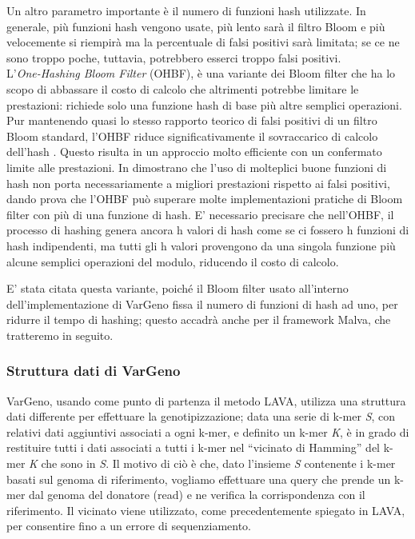 \documentclass[../main.tex]{subfiles}
\begin{document}
Un altro parametro importante è il numero di funzioni hash utilizzate. In generale, più funzioni hash vengono usate, più lento sarà il filtro Bloom e più velocemente si riempirà ma la percentuale di falsi positivi sarà limitata; se ce ne sono troppo poche, tuttavia, potrebbero esserci troppo falsi positivi.\\

L'\textit{One-Hashing Bloom Filter} (OHBF), è una variante dei Bloom filter che ha lo scopo di abbassare il costo di calcolo che altrimenti potrebbe limitare le prestazioni: richiede solo una funzione hash di base più altre semplici operazioni. Pur mantenendo quasi lo stesso rapporto teorico di falsi positivi di un filtro Bloom standard, l'OHBF riduce significativamente il sovraccarico di calcolo dell'hash \cite{bloomonehash}. Questo risulta in un approccio molto efficiente con un confermato limite alle prestazioni. In \cite{bloomonehash} dimostrano che l'uso di molteplici buone funzioni di hash non porta necessariamente a migliori prestazioni rispetto ai falsi positivi, dando prova che l'OHBF può superare molte implementazioni pratiche di Bloom filter con più di una funzione di hash. E' necessario precisare che nell'OHBF, il processo di hashing genera ancora h valori di hash come se ci fossero h funzioni di hash indipendenti, ma tutti gli h valori provengono da una singola funzione più alcune semplici operazioni del modulo, riducendo il costo di calcolo. 

E' stata citata questa variante, poiché il Bloom filter usato all'interno dell'implementazione di VarGeno fissa il numero di funzioni di hash ad uno, per ridurre il tempo di hashing; questo accadrà anche per il framework Malva, che tratteremo in seguito.


\subsubsection{Struttura dati di VarGeno}
VarGeno, usando come punto di partenza il metodo LAVA, utilizza una struttura dati differente per effettuare la genotipizzazione; data una serie di k-mer \textit{S}, con relativi dati aggiuntivi associati a ogni k-mer, e definito un k-mer \textit{K}, è in grado di restituire tutti i dati associati a tutti i k-mer nel “vicinato di Hamming” del k-mer \textit{K} che sono in \textit{S}. Il motivo di ciò è che, dato l'insieme \textit{S} contenente i k-mer basati sul genoma di riferimento, vogliamo effettuare una query che prende un k-mer dal genoma del donatore (read) e ne verifica la corrispondenza con il riferimento. Il vicinato viene utilizzato, come precedentemente spiegato in LAVA, per consentire fino a un errore di sequenziamento. 
\end{document}
